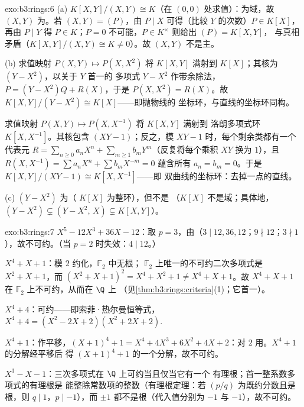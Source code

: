 \begin{solution}{exo:b3:rings:6}
(a) $K[X,Y]/(X,Y) \cong K$（在 $(0,0)$ 处求值）：为域，故
$(X,Y)$ 为。若 $(X, Y) = (P)$，由 $P \mid X$ 可得（比较
$Y$ 的次数）$P \in K[X]$，再由 $P \mid Y$ 得 $P \in K$；$P =
0$ 不可能，$P \in K^\times$ 则给出 $(P) = K[X,Y]$，
与真相矛盾（$K[X,Y]/(X,Y) \cong K \neq 0$）。故
$(X,Y)$ 不是主。

(b) 求值映射 $P(X, Y) \mapsto P(X, X^2)$ 将 $K[X,Y]$ 满射到
$K[X]$；其核为 $(Y - X^2)$，以关于 $Y$ 首一的
多项式 $Y - X^2$ 作带余除法，$P = (Y - X^2)Q + R(X)$，于是 $P(X, X^2) =
R(X)$。故 $K[X,Y]/(Y - X^2) \cong K[X]$——即抛物线的
坐标环，与直线的坐标环同构。

求值映射 $P(X, Y) \mapsto P(X, X^{-1})$ 将 $K[X, Y]$ 满射到
洛朗多项式环 $K[X, X^{-1}]$。其核包含
$(XY - 1)$；反之，模 $XY - 1$ 时，每个剩余类都有一个
代表元 $R = \sum_{n \geq 0} a_nX^n + \sum_{m \geq 1} b_m
Y^m$（反复将每个乘积 $XY$ 换为 $1$），且 $R(X,
X^{-1}) = \sum a_n X^n + \sum b_m X^{-m} = 0$ 蕴含所有 $a_n =
b_m = 0$。于是 $K[X, Y]/(XY - 1) \cong K[X, X^{-1}]$——即
双曲线的坐标环：去掉一点的直线。

(c) $(Y - X^2)$ 为（ $K[X]$ 为整环），但不是
（$K[X]$ 不是域；具体地，$(Y - X^2) \subsetneq
(Y - X^2,\, X) \subsetneq K[X,Y]$）。
\end{solution}

\begin{solution}{exo:b3:rings:7}
\emph{$X^5 - 12X^3 + 36X - 12$}：取 $p = 3$，由（$3 \mid
12, 36, 12$；$9 \nmid 12$；$3 \nmid 1$），故不可约。（当 $p = 2$
时失效：$4 \mid 12$。）

\emph{$X^4 + X + 1$}：模 $2$ 约化，$\mathbb F_2$ 中无根；
$\mathbb F_2$ 上唯一的不可约二次多项式是 $X^2 + X +
1$，而 $(X^2+X+1)^2 = X^4 + X^2 + 1 \neq X^4 + X + 1$。故 $X^4 +
X + 1$ 在 $\mathbb F_2$ 上不可约，从而在 $\Q$ 上
（见\cref{thm:b3:rings:criteria}(1)；它首一）。

\emph{$X^4 + 4$}：可约——即索菲·热尔曼恒等式，
$X^4 + 4 = (X^2 - 2X + 2)(X^2 + 2X + 2)$.

\emph{$X^4 + 1$}：作平移，$(X+1)^4 + 1 = X^4 + 4X^3 + 6X^2 + 4X +
2$：对 $2$ 用。$X^4+1$ 的分解经平移后
得 $(X+1)^4 + 1$ 的一个分解，故不可约。

\emph{$X^3 - X - 1$}：三次多项式在 $\Q$ 上可约当且仅当它有一个
有理根；首一整系数多项式的有理根是
能整除常数项的整数（有理根定理：若
$(p/q)$ 为既约分数且是根，则 $q \mid 1$，$p \mid -1$），而
$\pm 1$ 都不是根（代入值分别为 $-1$ 与 $-1$），故不可约。
\end{solution}

